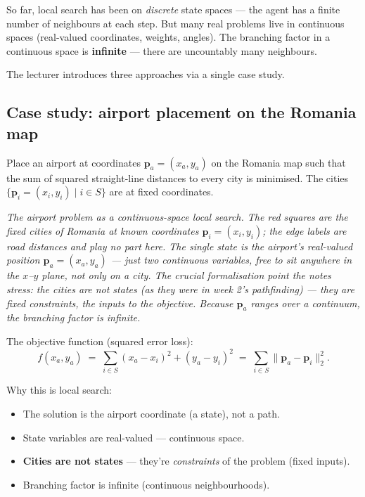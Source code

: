 \documentclass[11pt, a4paper]{article}
\begin{document}
So far, local search has been on \emph{discrete} state spaces — the agent has a finite number of neighbours at each step. But many real problems live in continuous spaces (real-valued coordinates, weights, angles). The branching factor in a continuous space is \textbf{infinite} — there are uncountably many neighbours.

The lecturer introduces three approaches via a single case study.

\subsection{Case study: airport placement on the Romania map}

\begin{defbox}
Place an airport at coordinates $\mathbf{p}_a = (x_a, y_a)$ on the Romania map such that the sum of squared straight-line distances to every city is minimised. The cities $\{\mathbf{p}_i = (x_i, y_i) \mid i \in S\}$ are at fixed coordinates.
\end{defbox}

\begin{center}

\footnotesize\textit{The airport problem as a continuous-space local search. The red squares are the fixed cities of Romania at known coordinates $\mathbf{p}_i=(x_i,y_i)$; the edge labels are road distances and play no part here. The single \emph{state} is the airport's real-valued position $\mathbf{p}_a=(x_a,y_a)$ --- just two continuous variables, free to sit \emph{anywhere} in the $x$--$y$ plane, not only on a city. The crucial formalisation point the notes stress: the cities are \emph{not} states (as they were in week 2's pathfinding) --- they are fixed \emph{constraints}, the inputs to the objective. Because $\mathbf{p}_a$ ranges over a continuum, the branching factor is infinite.}
\end{center}

The objective function (squared error loss):
\[
f(x_a, y_a) \;=\; \sum_{i \in S} (x_a - x_i)^2 + (y_a - y_i)^2 \;=\; \sum_{i \in S} \|\mathbf{p}_a - \mathbf{p}_i\|^2_2.
\]

Why this is local search:

\begin{itemize}
  \item The solution is the airport coordinate (a state), not a path.
  \item State variables are real-valued — continuous space.
  \item \textbf{Cities are not states} — they're \emph{constraints} of the problem (fixed inputs).
  \item Branching factor is infinite (continuous neighbourhoods).
\end{itemize}
\end{document}
